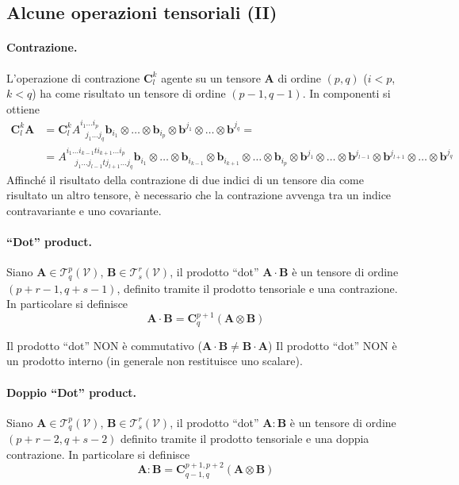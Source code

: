  \subsection{Alcune operazioni tensoriali (II)}

 \paragraph{Contrazione.} L'operazione di contrazione $\bm{C}^k_l$ agente su un tensore 
 $\bm{A}$ di ordine $(p,q)$ ($i<p$, $k<q$) ha come risultato un tensore di ordine $(p-1,q-1)$. In componenti si ottiene
 \begin{equation}
 \begin{aligned}
  \bm{C}^k_{l}\bm{A} & = \bm{C}^k_{l} A^{i_1 \dots i_p}_{\ \ \ j_1 \dots j_q} \bm{b}_{i_1} \otimes \dots \otimes \bm{b}_{i_p} \otimes
   \bm{b}^{j_1} \otimes \dots \otimes \bm{b}^{j_q} = \\
   & = A^{i_1 \dots i_{k-1} t i_{k+1} \dots i_p}_{\ \ \ \ \ j_1 \dots j_{l-1} t j_{l+1} \dots j_q} 
   \bm{b}_{i_1} \otimes \dots \otimes \bm{b}_{i_{k-1}} \otimes \bm{b}_{i_{k+1}} \otimes \dots \otimes \bm{b}_{i_p} \otimes
   \bm{b}^{j_1} \otimes \dots \otimes \bm{b}^{j_{l-1}} \otimes \bm{b}^{j_{l+1}} \otimes \dots \otimes \bm{b}^{j_q}
 \end{aligned}
 \end{equation}
 Affinché il risultato della contrazione di due indici di un tensore dia come risultato un altro tensore,
 è necessario che la contrazione avvenga tra un indice contravariante e uno covariante.
 
 \paragraph{``Dot'' product.} Siano $\bm{A} \in \mathcal{T}^p_q(\mathcal{V})$, $\bm{B} \in \mathcal{T}^r_s(\mathcal{V})$, il
 prodotto ``dot'' $\bm{A} \cdot \bm{B}$ è un tensore di ordine $(p+r-1,q+s-1)$, definito tramite il prodotto tensoriale e una contrazione.
 In particolare si definisce
 \begin{equation}
  \bm{A} \cdot \bm{B} = \bm{C}^{p+1}_{q} (\bm{A} \otimes \bm{B})
 \end{equation}
 
 \noindent
 Il prodotto ``dot'' NON è commutativo ($\bm{A} \cdot \bm{B} \neq \bm{B} \cdot \bm{A}$)
 Il prodotto ``dot'' NON è un prodotto interno (in generale non restituisce uno scalare).
 
 \paragraph{Doppio ``Dot'' product.}
 Siano $\bm{A} \in \mathcal{T}^p_q(\mathcal{V})$, $\bm{B} \in \mathcal{T}^r_s(\mathcal{V})$, il
 prodotto ``dot'' $\bm{A} : \bm{B}$ è un tensore di ordine $(p+r-2,q+s-2)$ definito tramite il prodotto tensoriale e una doppia contrazione.
  In particolare si definisce
 \begin{equation}
  \bm{A} : \bm{B} = \bm{C}^{p+1,p+2}_{q-1,q} (\bm{A} \otimes \bm{B})
 \end{equation}
 
